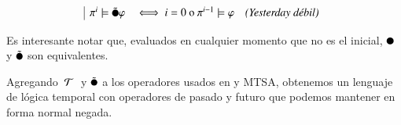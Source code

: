 \[
	\begin{array}{|l l l}
		\pi^i \models \weakprev \varphi & \iff i = 0 \text{ o } \pi^{i-1} \models \varphi & \textit{(Yesterday débil)}
	\end{array}
\]

Es interesante notar que, evaluados en cualquier momento que no es el inicial, $\prev$ y $\weakprev$ son equivalentes.

Agregando $\text{ }\mathcal{T}\text{ }$ y $\weakprev$ a los operadores usados en \citet{pnueli93} y MTSA, obtenemos un lenguaje de lógica temporal con operadores de pasado y futuro que podemos mantener en forma normal negada.
